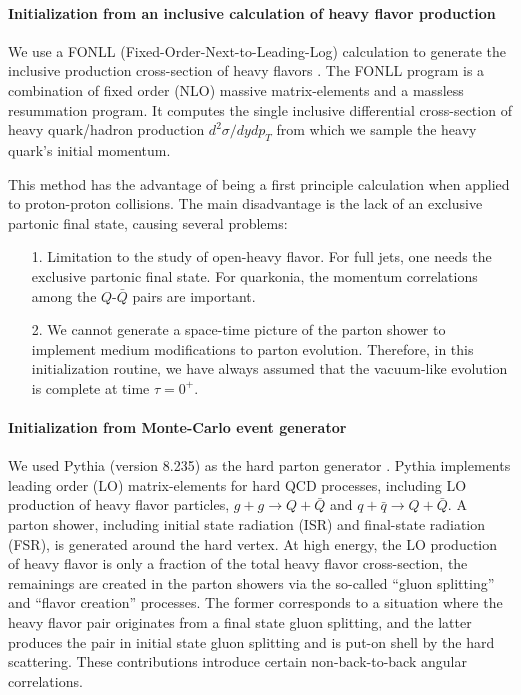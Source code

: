 \paragraph{Initialization from an inclusive calculation of heavy flavor production}
We use a  FONLL (Fixed-Order-Next-to-Leading-Log) calculation to generate the inclusive production cross-section of heavy flavors \cite{Cacciari:1998it}.
The FONLL program is a combination of fixed order (NLO) massive matrix-elements and a massless resummation program.
It computes the single inclusive differential cross-section of heavy quark/hadron production $d^2\sigma/dydp_T$ from which we sample the heavy quark's initial momentum.

This method has the advantage of being a first principle calculation when applied to proton-proton collisions. 
The main disadvantage is the lack of an exclusive partonic final state, causing several problems:
\begin{itemize}
\item[1.] Limitation to the study of open-heavy flavor.
For full jets, one needs the exclusive partonic final state. For quarkonia, the momentum correlations among the $Q$-$\bar{Q}$ pairs are important.
\item[2.] We cannot generate a space-time picture of the parton shower to implement medium modifications to parton evolution. 
Therefore, in this initialization routine, we have always assumed that the vacuum-like evolution is complete at time $\tau=0^{+}$.
\end{itemize}

\paragraph{Initialization from Monte-Carlo event generator}
We used Pythia (version 8.235) as the hard parton generator \cite{Sjostrand:2014zea, Sjostrand:2006za}.
Pythia implements leading order (LO) matrix-elements for hard QCD processes, including LO production of heavy flavor particles,
$g+g\rightarrow Q+\bar{Q}$ and $q+\bar{q}\rightarrow Q+\bar{Q}$.
A parton shower, including initial state radiation (ISR) and final-state radiation (FSR), is generated around the hard vertex.
At high energy, the LO production of heavy flavor is only a fraction of the total heavy flavor cross-section, the remainings are created in the parton showers via the so-called ``gluon splitting'' and ``flavor creation'' processes.
The former corresponds to a situation where the heavy flavor pair originates from a final state gluon splitting, and the latter produces the pair in initial state gluon splitting and is put-on shell by the hard scattering.
These contributions introduce certain non-back-to-back angular correlations.

